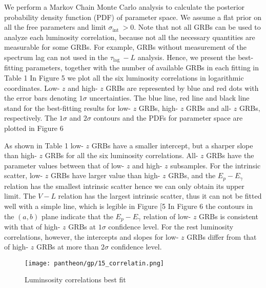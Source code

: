 We perform a Markov Chain Monte Carlo analysis to calculate the posterior probability density function (PDF) of parameter space. We assume a flat prior on all the free parameters and limit $\sigma_{\text {int }}>0$. Note that not all GRBs can be used to analyze each luminosity correlation, because not all the necessary quantities are measurable for some GRBs. For example, GRBs without measurement of the spectrum lag can not used in the $\tau_{\text {lag }}-L$ analysis. Hence, we present the best-fitting parameters, together with the number of available GRBs in each fitting in Table 1 In Figure 5 we plot all the six luminosity correlations in logarithmic coordinates. Low- $z$ and high- $z$ GRBs are represented by blue and red dots with the error bars denoting $1 \sigma$ uncertainties. The blue line, red line and black line stand for the best-fitting results for low- $z$ GRBs, high- $z$ GRBs and all- $z$ GRBs, respectively. The $1 \sigma$ and $2 \sigma$ contours and the PDFs for parameter space are plotted in Figure 6

As shown in Table 1 low- $z$ GRBs have a smaller intercept, but a sharper slope than high- $z$ GRBs for all the six luminosity correlations. All- $z$ GRBs have the parameter values between that of low- $z$ and high- $z$ subsamples. For the intrinsic scatter, low- $z$ GRBs have larger value than high- $z$ GRBs, and the $E_{p}-E_{\gamma}$ relation has the smallest intrinsic scatter hence we can only obtain its upper limit. The $V-L$ relation has the largest intrinsic scatter, thus it can not be fitted well with a simple line, which is legible in Figure [5 In Figure 6 the contours in the $(a, b)$ plane indicate that the $E_{p}-E_{\gamma}$ relation of low- $z$ GRBs is consistent with that of high- $z$ GRBs at $1 \sigma$ confidence level. For the rest luminosity correlations, however, the intercepts and slopes for low- $z$ GRBs differ from that of high- $z$ GRBs at more than $2 \sigma$ confidence level.

\begin{figure}[H]
	\centering
	\texttt{[image: pantheon/gp/15\_correlatin.png]}
	\caption{Luminsosity correlations best fit}
	\label{fig:correlation_gp}
\end{figure}
